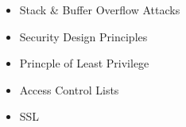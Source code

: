 \documentclass[12pt]{article}
\begin{document}
\begin{itemize}
    \item Stack \& Buffer Overflow Attacks
    \item Security Design Principles
    \item Princple of Least Privilege
    \item Access Control Lists
    \item SSL
\end{itemize}
\end{document}

